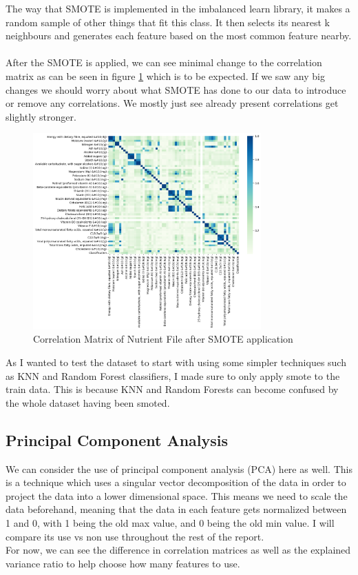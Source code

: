 \documentclass[12pt,a4paper]{article}
\begin{document}
    
    The way that SMOTE is implemented in the imbalanced learn library, it makes a
    random sample of other things that fit this class. It then selects its nearest k
    neighbours and generates each feature based on the most common feature nearby.
    \\
    \\
    After the SMOTE is applied, we can see minimal change to the correlation matrix
    as can be seen in figure \ref{fig:postsmotecorrmat} which is to be expected.
    If we saw any big changes we should worry about what SMOTE has done to our data
    to introduce or remove any correlations. We mostly just see already present correlations
    get slightly stronger.

    \begin{figure}[h]
        \caption{Correlation Matrix of Nutrient File after SMOTE application}
        \centering
        \label{fig:postsmotecorrmat}
        \includegraphics[width=0.78\textwidth]{nopca_postsmote_heatmap}
    \end{figure}

    As I wanted to test the dataset to start with using some simpler techniques such
    as KNN and Random Forest classifiers, I made sure to only apply smote to the train
    data. This is because KNN and Random Forests can become confused by the whole dataset
    having been smoted.

    \subsection{Principal Component Analysis}
    We can consider the use of principal component analysis (PCA) here as well. This is a technique
    which uses a singular vector decomposition of the data in order to project the data into a lower
    dimensional space. This means we need to scale the data beforehand, meaning that the data in each
    feature gets normalized between 1 and 0, with 1 being the old max value, and 0 being the old min 
    value. I will compare its use vs non use throughout the rest of the report.
    \\
    For now, we can see the difference in correlation matrices as well as the explained 
    variance ratio to help choose how many features to use.
\end{document}
